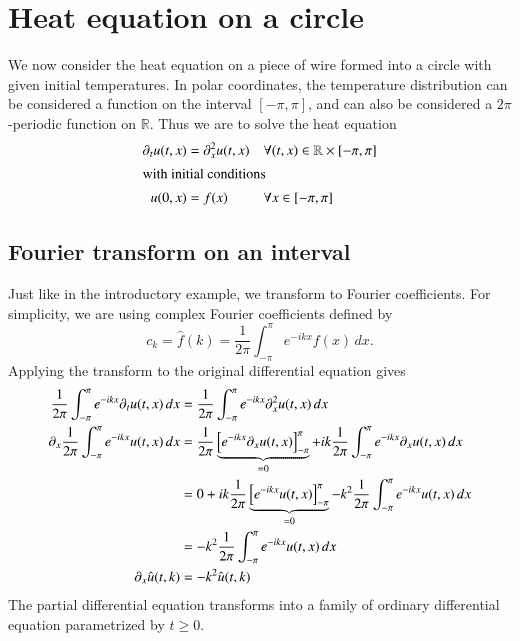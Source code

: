 %
%
%
\section{Heat equation on a circle}
We now consider the heat equation on a piece of wire formed into
a circle with given initial temperatures.
In polar coordinates, the temperature distribution can be considered
a function on the interval $[-\pi,\pi]$, and can also be considered
a $2\pi$-periodic function on $\mathbb R$.
Thus we are to solve the heat equation
\begin{align*}
\partial_t u(t,x)&=\partial_x^2 u(t,x) &&\forall(t,x)\in\mathbb R\times[-\pi,\pi]\\
\intertext{with initial conditions}
u(0,x)&=f(x)&& \forall x\in[-\pi,\pi]\\
\end{align*}

\subsection{Fourier transform on an interval}
Just like in the introductory example, we transform to Fourier coefficients.
For simplicity, we are using complex Fourier coefficients defined by
\[
c_k=\hat f(k)=\frac1{2\pi}\int_{-\pi}^{\pi}e^{-ikx}f(x)\,dx.
\]
Applying the transform to the original differential equation gives
\begin{align}
\frac1{2\pi}\int_{-\pi}^{\pi}e^{-ikx}\partial_t u(t,x)\,dx
&=\frac1{2\pi}\int_{-\pi}^{\pi}e^{-ikx}\partial_x^2 u(t,x)\,dx
\notag
\\
\partial_x\frac1{2\pi}\int_{-\pi}^{\pi}e^{-ikx} u(t,x)\,dx
&=
\frac1{2\pi}
\underbrace{
\left[
e^{-ikx}\partial_x u(t,x)
\right]_{-\pi}^{\pi}}_{=0}
+
ik\frac1{2\pi}\int_{-\pi}^{\pi}e^{-ikx}\partial_x u(t,x)\,dx
\notag
\\
&=
0 + 
ik\frac1{2\pi}
\underbrace{
\left[
e^{-ikx}u(t,x)
\right]_{-\pi}^{\pi}}_{=0}
-
k^2\frac1{2\pi}\int_{-\pi}^{\pi}e^{-ikx} u(t,x)\,dx
\notag
\\
&=
-
k^2\frac1{2\pi}\int_{-\pi}^{\pi}e^{-ikx} u(t,x)\,dx
\notag
\\
\partial_x\hat u(t,k)&=-k^2 \hat u(t,k)
\label{fouriertransformiert}
\end{align}
The partial differential equation transforms into a family of ordinary
differential equation parametrized by $t\ge 0$.

